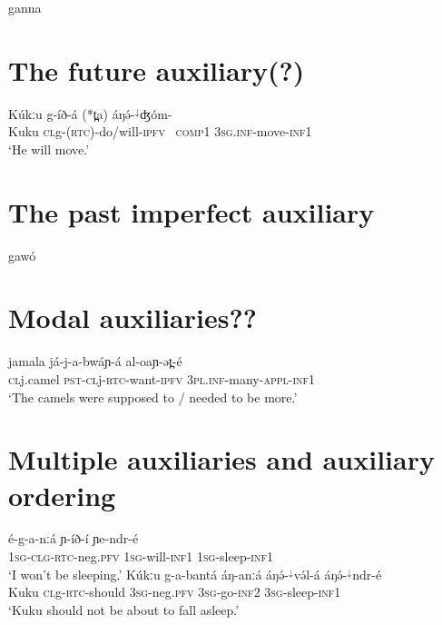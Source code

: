 ganna 


\section{The future auxiliary(?)}

\ea \gll Kúkːu g-íð-á (*t̪a) áŋə́-$^{↓}$ʤóm-\\
Kuku \textsc{cl}g-(\textsc{rtc})-do/will-\textsc{ipfv} {\ \textsc{comp1}} \textsc{3sg.inf}-move-\textsc{inf1}\\
\glt ‘He will move.’
\z 


\section{The past imperfect auxiliary}\label{sec:ch14:pstipfv}

gawó

\section{Modal auxiliaries??}

\ea \gll  jamala já-j-a-bwáɲ-á al-oaɲ-ət̪-é		\\	
\textsc{cl}j.camel \textsc{pst}-\textsc{cl}j-\textsc{rtc}-want-\textsc{ipfv} \textsc{3pl.inf}-many-\textsc{appl}-\textsc{inf1}\\
\glt ‘The camels were supposed to / needed to be more.’
\z 




\section{Multiple auxiliaries and auxiliary ordering}

\ea 
\ea \gll  é-g-a-nːá ɲ-íð-í ɲe-ndr-é\\
\textsc{1sg-clg}-\textsc{rtc}-neg.\textsc{pfv} \textsc{1sg}-will-\textsc{inf1} \textsc{1sg}-sleep-\textsc{inf1}  \\
\glt `I won’t be sleeping.'
\ex \gll  Kúkːu g-a-bantá áŋ-anːá áŋə́-$^{↓}$və́l-á áŋə́-$^{↓}$ndr-é\\	
Kuku \textsc{cl}g-\textsc{rtc}-should  \textsc{3sg}-neg.\textsc{pfv}  \textsc{3sg}-go-\textsc{inf2}  \textsc{3sg}-sleep-\textsc{inf1}  \\
\glt `Kuku should not be about to fall asleep.'
\z 
\z 
